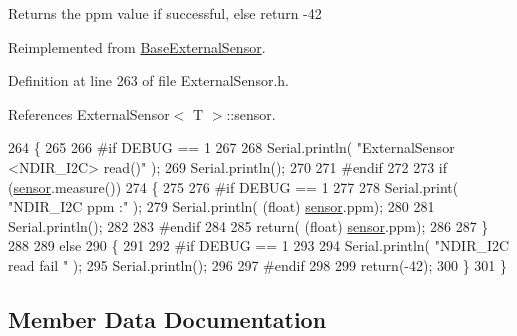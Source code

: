 \begin{DoxyReturn}{Returns}
the ppm value if successful, else return -\/42 
\end{DoxyReturn}


Reimplemented from \hyperlink{classBaseExternalSensor_a1564f16deacf57b51b9948ac29db4291}{Base\+External\+Sensor}.



Definition at line 263 of file External\+Sensor.\+h.



References External\+Sensor$<$ T $>$\+::sensor.


\begin{DoxyCode}
264     \{
265         
266 \textcolor{preprocessor}{    #if DEBUG == 1 }
267         
268         Serial.println( \textcolor{stringliteral}{"ExternalSensor <NDIR\_I2C> read()"} );
269         Serial.println();
270 
271 \textcolor{preprocessor}{    #endif}
272 
273         \textcolor{keywordflow}{if} (\hyperlink{classExternalSensor_3_01NDIR__I2C_01_4_ae541c9cece7c38674b70114cdb74a7dc}{sensor}.measure())
274         \{
275         
276 \textcolor{preprocessor}{        #if DEBUG == 1 }
277 
278             Serial.print( \textcolor{stringliteral}{"NDIR\_I2C ppm :"} );
279             Serial.println( (\textcolor{keywordtype}{float}) \hyperlink{classExternalSensor_3_01NDIR__I2C_01_4_ae541c9cece7c38674b70114cdb74a7dc}{sensor}.ppm);
280             
281             Serial.println();           
282 
283 \textcolor{preprocessor}{        #endif}
284 
285             \textcolor{keywordflow}{return}( (\textcolor{keywordtype}{float}) \hyperlink{classExternalSensor_3_01NDIR__I2C_01_4_ae541c9cece7c38674b70114cdb74a7dc}{sensor}.ppm);
286             
287         \}
288         
289         \textcolor{keywordflow}{else}
290         \{
291         
292 \textcolor{preprocessor}{        #if DEBUG == 1 }
293 
294             Serial.println( \textcolor{stringliteral}{"NDIR\_I2C read fail "} );
295             Serial.println();
296         
297 \textcolor{preprocessor}{        #endif}
298 
299             \textcolor{keywordflow}{return}(-42);
300         \}
301     \}
\end{DoxyCode}


\subsection{Member Data Documentation}
\mbox{\label{classExternalSensor_3_01NDIR__I2C_01_4_ae541c9cece7c38674b70114cdb74a7dc}} 

